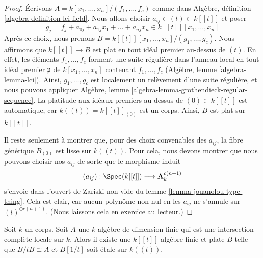 \begin{proof}
Écrivons $A = k[x_1, \ldots, x_n]/(f_1, \ldots, f_c)$ comme dans
Algèbre, définition \ref{algebra-definition-lci-field}.
Nous allons choisir
$a_{ij} \in (t) \subset k[[t]]$ et poser
$$
g_j = f_j + a_{0j} + a_{1j}x_1 + \ldots + a_{nj}x_n \in
k[[t]][x_1, \ldots, x_n]
$$
Après ce choix, nous prenons
$B = k[[t]][x_1, \ldots, x_n]/(g_1, \ldots, g_c)$.
Nous affirmons que $k[[t]] \to B$ est plat en tout idéal premier
au-dessus de $(t)$. En effet, les éléments $f_1, \ldots, f_c$
forment une suite régulière dans l'anneau local en tout idéal premier
$\mathfrak p$ de $k[x_1, \ldots, x_n]$ contenant $f_1, \ldots, f_c$
(Algèbre, lemme \ref{algebra-lemma-lci}). Ainsi, $g_1, \ldots, g_c$
est localement un relèvement d'une suite régulière, et nous pouvons appliquer
Algèbre, lemme \ref{algebra-lemma-grothendieck-regular-sequence}.
La platitude aux idéaux premiers au-dessus de $(0) \subset k[[t]]$ est automatique,
car $k((t)) = k[[t]]_{(0)}$ est un corps. Ainsi, $B$ est plat
sur $k[[t]]$.

\medskip\noindent
Il reste seulement à montrer que, pour des choix convenables
des $a_{ij}$, la fibre générique $B_{(0)}$ est lisse sur
$k((t))$. Pour cela, nous devons montrer que nous pouvons choisir
nos $a_{ij}$ de sorte que le morphisme induit
$$
(a_{ij}) : \Spec(k[[t]]) \longrightarrow \mathbf{A}^{c(n + 1)}_k
$$
s'envoie dans l'ouvert de Zariski non vide du
lemme \ref{lemma-jouanolou-type-thing}.
Cela est clair, car aucun polynôme non nul en les
$a_{ij}$ ne s'annule sur $(t)^{\oplus c(n + 1)}$.
(Nous laissons cela en exercice au lecteur.)
\end{proof}

\begin{lemma}
\label{lemma-smoothing-artinian-lci}
Soit $k$ un corps. Soit $A$ une $k$-algèbre de dimension finie
qui est une intersection complète locale sur $k$. Alors il existe
une $k[[t]]$-algèbre finie et plate $B$ telle que $B/tB \cong A$
et $B[1/t]$ soit \'etale sur $k((t))$.
\end{lemma}

